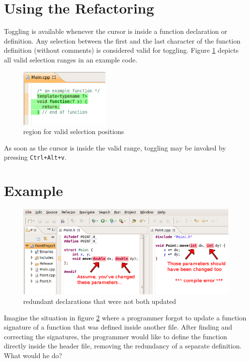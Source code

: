 \section{Using the Refactoring}

Toggling is available whenever the cursor is inside a function declaration 
or definition. Any selection between the first and the last character of 
the function definition (without comments) is considered valid for toggling. 
Figure \ref{selection} depicts all valid selection ranges in an example code.
\begin{figure}[h]
\centering
\includegraphics[width=0.4\textwidth]{images/selection.png}
\caption{region for valid selection positions}
\label{selection}
\end{figure}
As soon as the cursor is inside the valid range, toggling may be invoked by 
pressing \texttt{Ctrl+Alt+v}.

\section{Example}

\begin{figure}[h]
\centering
\includegraphics[width=\textwidth]{images/differing_signatures.png}
\caption{redundant declarations that were not both updated}
\label{differingSignatures}
\end{figure}
Imagine the situation in figure \ref{differingSignatures} where a programmer 
forgot to update a function signature of a function that was defined inside 
another file.
After finding and correcting the signatures, the programmer would like to define 
the function directly inside the header file, removing the redundancy of a 
separate definition. What would he do?

